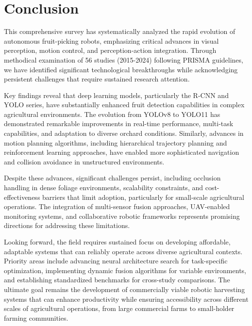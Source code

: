 \documentclass{ieeeaccess}
\begin{document}
\section{Conclusion}
This comprehensive survey has systematically analyzed the rapid evolution of autonomous fruit-picking robots, emphasizing critical advances in visual perception, motion control, and perception-action integration. Through methodical examination of 56 studies (2015-2024) following PRISMA guidelines, we have identified significant technological breakthroughs while acknowledging persistent challenges that require sustained research attention.

Key findings reveal that deep learning models, particularly the R-CNN and YOLO series, have substantially enhanced fruit detection capabilities in complex agricultural environments. The evolution from YOLOv8 to YOLO11 has demonstrated remarkable improvements in real-time performance, multi-task capabilities, and adaptation to diverse orchard conditions. Similarly, advances in motion planning algorithms, including hierarchical trajectory planning and reinforcement learning approaches, have enabled more sophisticated navigation and collision avoidance in unstructured environments.

Despite these advances, significant challenges persist, including occlusion handling in dense foliage environments, scalability constraints, and cost-effectiveness barriers that limit adoption, particularly for small-scale agricultural operations. The integration of multi-sensor fusion approaches, UAV-enabled monitoring systems, and collaborative robotic frameworks represents promising directions for addressing these limitations.

Looking forward, the field requires sustained focus on developing affordable, adaptable systems that can reliably operate across diverse agricultural contexts. Priority areas include advancing neural architecture search for task-specific optimization, implementing dynamic fusion algorithms for variable environments, and establishing standardized benchmarks for cross-study comparisons. The ultimate goal remains the development of commercially viable robotic harvesting systems that can enhance productivity while ensuring accessibility across different scales of agricultural operations, from large commercial farms to small-holder farming communities. 

\end{document}
